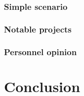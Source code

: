 \documentclass[a4paper,11pt]{report}
\begin{document}
  \subsubsection{Simple scenario}
  
  \subsubsection{Notable projects}
  
  \subsubsection{Personnel opinion}
  
  
  
  
  \section{Conclusion}

  
%
%
\end{document}
